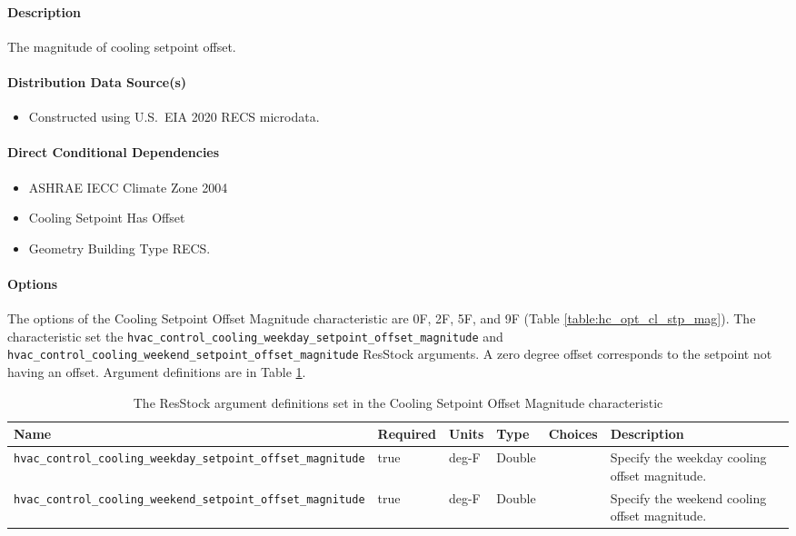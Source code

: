 \paragraph{Description}
The magnitude of cooling setpoint offset.

\paragraph{Distribution Data Source(s)}
\begin{itemize}
    \item Constructed using U.S.~EIA 2020 RECS microdata.
\end{itemize}

\paragraph{Direct Conditional Dependencies}
\begin{itemize}
    \item ASHRAE IECC Climate Zone 2004
    \item Cooling Setpoint Has Offset
    \item Geometry Building Type RECS.
\end{itemize}

\paragraph{Options}
The options of the Cooling Setpoint Offset Magnitude characteristic are 0\degree F, 2\degree F, 5\degree F, and 9\degree F (Table \ref{table:hc_opt_cl_stp_mag}). The characteristic set the \texttt{hvac\_control\_cooling\_weekday\_setpoint\_offset\_magnitude} and
\texttt{hvac\_control\_cooling\_weekend\_setpoint\_offset\_magnitude} ResStock arguments. A zero degree offset corresponds to the setpoint not having an offset. Argument definitions are in Table \ref{table:hc_arg_def_cl_stp_mag}. 

\begin{longtable}[]{ |p{}|p{1.5cm}|p{1cm}|p{1.1cm}|p{1.4cm}|p{6cm}| }
\caption{The ResStock argument definitions set in the Cooling Setpoint Offset Magnitude characteristic} \label{table:hc_arg_def_cl_stp_mag} \\
\toprule\noalign{}
Name & Required & Units & Type & Choices & Description \\
\midrule\noalign{}
\endhead
\bottomrule\noalign{}
\endlastfoot
\texttt{hvac\_control\_cooling\_weekday\_setpoint\_offset\_magnitude} &
true & deg-F & Double & & Specify the weekday cooling offset
magnitude. \\
\hline
\texttt{hvac\_control\_cooling\_weekend\_setpoint\_offset\_magnitude} &
true & deg-F & Double & & Specify the weekend cooling offset
magnitude. \\
\end{longtable}


